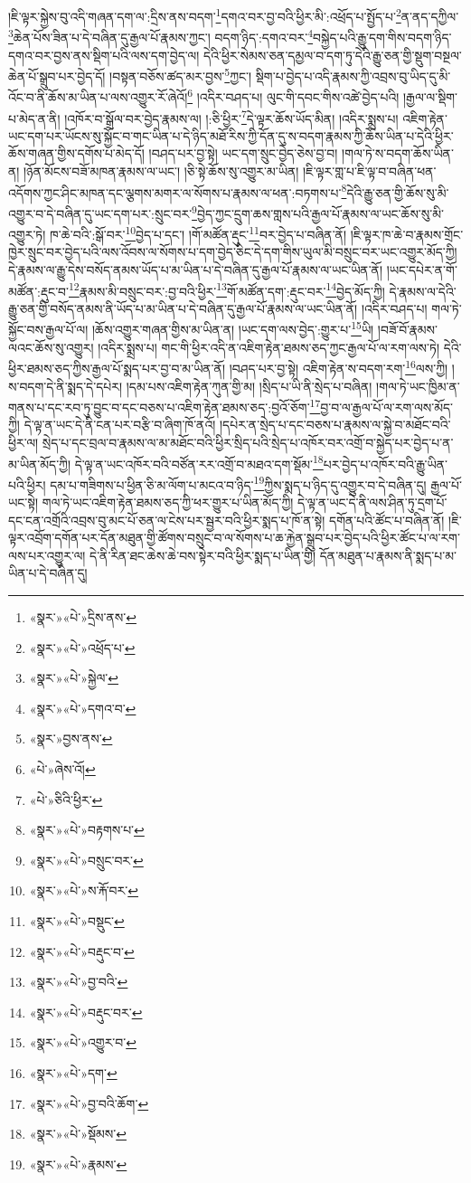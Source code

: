 །ཇི་ལྟར་སྐྱེས་བུ་འདི་གཞན་དག་ལ་:དྲིས་ནས་བདག་\footnote{«སྣར་»«པེ་»དྲིས་ནས་}དགའ་བར་བྱ་བའི་ཕྱིར་མི་:འཕྲོད་པ་སྤྱོད་པ་\footnote{«སྣར་»«པེ་»འཕྲོད་པ་}ན་ནད་དཀྱིལ་\footnote{«སྣར་»«པེ་»སྐྱེལ་}ཆེན་པོས་ཟིན་པ་དེ་བཞིན་དུ་རྒྱལ་པོ་རྣམས་ཀྱང་། བདག་ཉིད་:དགའ་བར་\footnote{«སྣར་»«པེ་»དགའ་བ་}བསྐྱེད་པའི་རྒྱུ་དག་གིས་བདག་ཉིད་དགའ་བར་བྱས་ནས་སྡིག་པའི་ལས་དག་བྱེད་ལ། དེའི་ཕྱིར་སེམས་ཅན་དམྱལ་བ་དག་ཏུ་དེའི་རྒྱུ་ཅན་གྱི་སྡུག་བསྔལ་ཆེན་པོ་སྒྲུབ་པར་བྱེད་དོ། །བསྟན་བཅོས་ཚད་མར་བྱས་\footnote{«སྣར་»བྱས་ནས་}ཀྱང་། སྡིག་པ་བྱེད་པ་འདི་རྣམས་ཀྱི་འབྲས་བུ་ཡིད་དུ་མི་འོང་བ་ནི་ཆོས་མ་ཡིན་པ་ལས་འགྱུར་རོ་ཞེའོ།\footnote{«པེ་»ཞེས་འོ།} །འདིར་བཤད་པ། ལུང་གི་དབང་གིས་འཚེ་བྱེད་པའི། །རྒྱལ་ལ་སྡིག་པ་མེད་ན་ནི། །འཁོར་བ་སྒྲོལ་བར་བྱེད་རྣམས་ལ། །:ཅི་ཕྱིར་\footnote{«པེ་»ཅིའི་ཕྱིར་}དེ་ལྟར་ཆོས་ཡོད་མིན། །འདིར་སྨྲས་པ། འཇིག་རྟེན་ཡང་དག་པར་ཡོངས་སུ་སྐྱོང་བ་གང་ཡིན་པ་དེ་ཉིད་མཐོ་རིས་ཀྱི་དོན་དུ་ས་བདག་རྣམས་ཀྱི་ཆོས་ཡིན་པ་དེའི་ཕྱིར་ཆོས་གཞན་གྱིས་དགོས་པ་མེད་དོ། །བཤད་པར་བྱ་སྟེ། ཡང་དག་སྲུང་བྱེད་ཅེས་བྱ་བ། །གལ་ཏེ་ས་བདག་ཆོས་ཡིན་ན། །ཉོན་མོངས་བཟོ་མཁན་རྣམས་ལ་ཡང་། །ཅི་སྟེ་ཆོས་སུ་འགྱུར་མ་ཡིན། །ཇི་ལྟར་གླ་པ་ཇི་ལྟ་བ་བཞིན་ཕན་འདོགས་ཀྱང་ཤིང་མཁན་དང་ལྕགས་མགར་ལ་སོགས་པ་རྣམས་ལ་ཕན་:བཏགས་པ་\footnote{«སྣར་»«པེ་»བརྟགས་པ་}དེའི་རྒྱུ་ཅན་གྱི་ཆོས་སུ་མི་འགྱུར་བ་དེ་བཞིན་དུ་ཡང་དག་པར་:སྲུང་བར་\footnote{«སྣར་»«པེ་»བསྲུང་བར་}བྱེད་ཀྱང་དྲུག་ཆས་གླས་པའི་རྒྱལ་པོ་རྣམས་ལ་ཡང་ཆོས་སུ་མི་འགྱུར་ཏེ། ཁ་ཆེ་བའི་:སྒོ་བར་\footnote{«སྣར་»«པེ་»ས་རྐོ་བར་}བྱེད་པ་དང་། །གོ་མཚོན་རྡུང་\footnote{«སྣར་»«པེ་»བསྡུང་}བར་བྱེད་པ་བཞིན་ནོ། །ཇི་ལྟར་ཁ་ཆེ་བ་རྣམས་གྲོང་ཁྱེར་སྲུང་བར་བྱེད་པའི་ལས་འོབས་ལ་སོགས་པ་དག་བྱེད་ཅིང་དེ་དག་གིས་ཡུལ་མི་བསྲུང་བར་ཡང་འགྱུར་མོད་ཀྱི། དེ་རྣམས་ལ་རྒྱུ་དེས་བསོད་ནམས་ཡོད་པ་མ་ཡིན་པ་དེ་བཞིན་དུ་རྒྱལ་པོ་རྣམས་ལ་ཡང་ཡིན་ནོ། །ཡང་དཔེར་ན་གོ་མཚོན་:རྡུང་བ་\footnote{«སྣར་»«པེ་»བརྡུང་བ་}རྣམས་མི་བསྲུང་བར་:བྱ་བའི་ཕྱིར་\footnote{«སྣར་»«པེ་»བྱ་བའི་}གོ་མཚོན་དག་:རྡུང་བར་\footnote{«སྣར་»«པེ་»བརྡུང་བར་}བྱེད་མོད་ཀྱི། དེ་རྣམས་ལ་དེའི་རྒྱུ་ཅན་གྱི་བསོད་ནམས་ནི་ཡོད་པ་མ་ཡིན་པ་དེ་བཞིན་དུ་རྒྱལ་པོ་རྣམས་ལ་ཡང་ཡིན་ནོ། །འདིར་བཤད་པ། གལ་ཏེ་སྐྱོང་བས་རྒྱལ་པོ་ལ། །ཆོས་འགྱུར་གཞན་གྱིས་མ་ཡིན་ན། །ཡང་དག་ལས་བྱེད་:གྱུར་པ་\footnote{«སྣར་»«པེ་»འགྱུར་བ་}ཡི། །བཟོ་བོ་རྣམས་ལའང་ཆོས་སུ་འགྱུར། །འདིར་སྨྲས་པ། གང་གི་ཕྱིར་འདི་ན་འཇིག་རྟེན་ཐམས་ཅད་ཀྱང་རྒྱལ་པོ་ལ་རག་ལས་ཏེ། དེའི་ཕྱིར་ཐམས་ཅད་ཀྱིས་རྒྱལ་པོ་སྨད་པར་བྱ་བ་མ་ཡིན་ནོ། །བཤད་པར་བྱ་སྟེ། འཇིག་རྟེན་ས་བདག་རག་\footnote{«སྣར་»«པེ་»དག་}ལས་ཀྱི། །ས་བདག་དེ་ནི་སྨད་དེ་དཔེར། །དམ་པས་འཇིག་རྟེན་ཀུན་གྱི་མ། །སྲིད་པ་ཡི་ནི་སྲེད་པ་བཞིན། །གལ་ཏེ་ཡང་ཁྱིམ་ན་གནས་པ་དང་རབ་ཏུ་བྱུང་བ་དང་བཅས་པ་འཇིག་རྟེན་ཐམས་ཅད་:བྱའོ་ཅོག་\footnote{«སྣར་»«པེ་»བྱ་བའི་ཆོག་}བྱ་བ་ལ་རྒྱལ་པོ་ལ་རག་ལས་མོད་ཀྱི། དེ་ལྟ་ན་ཡང་དེ་ནི་ངན་པར་བརྩི་བ་ཞིག་ཁོ་ནའོ། །དཔེར་ན་སྲེད་པ་དང་བཅས་པ་རྣམས་ལ་སྐྱེ་བ་མཐོང་བའི་ཕྱིར་ལ། སྲེད་པ་དང་བྲལ་བ་རྣམས་ལ་མ་མཐོང་བའི་ཕྱིར་སྲིད་པའི་སྲེད་པ་འཁོར་བར་འགྲོ་བ་སྐྱེད་པར་བྱེད་པ་ན་མ་ཡིན་མོད་ཀྱི། དེ་ལྟ་ན་ཡང་འཁོར་བའི་བཙོན་རར་འགྲོ་བ་མཐའ་དག་སྡོམ་\footnote{«སྣར་»«པེ་»སྡོམས་}པར་བྱེད་པ་འཁོར་བའི་རྒྱུ་ཡིན་པའི་ཕྱིར། དམ་པ་གཟིགས་པ་ཕྱིན་ཅི་མ་ལོག་པ་མངའ་བ་ཉིད་\footnote{«སྣར་»«པེ་»རྣམས་}ཀྱིས་སྨད་པ་ཉིད་དུ་འགྱུར་བ་དེ་བཞིན་དུ། རྒྱལ་པོ་ཡང་སྟེ། གལ་ཏེ་ཡང་འཇིག་རྟེན་ཐམས་ཅད་ཀྱི་ཕར་གྱུར་པ་ཡིན་མོད་ཀྱི། དེ་ལྟ་ན་ཡང་དེ་ནི་ལས་ཤིན་ཏུ་དྲག་པོ་དང་ངན་འགྲོའི་འབྲས་བུ་མང་པོ་ཅན་ལ་ངེས་པར་སྦྱར་བའི་ཕྱིར་སྨད་པ་ཁོ་ན་སྟེ། དགོན་པའི་ཚོང་པ་བཞིན་ནོ། །ཇི་ལྟར་འབྲོག་དགོན་པར་དོན་མཐུན་གྱི་ཚོགས་བསྲུང་བ་ལ་སོགས་པ་ཆ་རྐྱེན་སྒྲུབ་པར་བྱེད་པའི་ཕྱིར་ཚོང་པ་ལ་རག་ལས་པར་འགྱུར་ལ། དེ་ནི་རིན་ཐང་ཆེས་ཆེ་བས་སྟེར་བའི་ཕྱིར་སྨད་པ་ཡིན་གྱི། དོན་མཐུན་པ་རྣམས་ནི་སྨད་པ་མ་ཡིན་པ་དེ་བཞིན་དུ། 